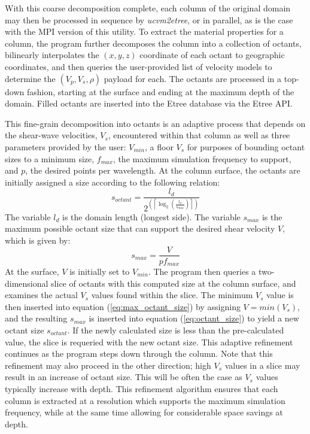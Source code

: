 With this coarse decomposition complete, each column of the original domain may then be processed in sequence by \emph{ucvm2etree}, or in parallel, as is the case with the MPI version of this utility. To extract the material properties for a column, the program further decomposes the column into a collection of octants, bilinearly interpolates the $(x,y,z)$ coordinate of each octant to geographic coordinates, and then queries the user-provided list of velocity models to determine the $(V_p, V_s, \rho)$ payload for each. The octants are processed in a top-down fashion, starting at the surface and ending at the maximum depth of the domain. Filled octants are inserted into the Etree database via the Etree API.

This fine-grain decomposition into octants is an adaptive process that depends on the shear-wave velocities, $V_s$, encountered within that column as well as three parameters provided by the user: $V_{min}$, a floor $V_s$ for purposes of bounding octant sizes to a minimum size, $f_{max}$, the maximum simulation frequency to support, and $p$, the desired points per wavelength. At the column surface, the octants are initially assigned a size according to the following relation:
\begin{equation}\label{eq:octant_size}
s_{octant} = \frac{l_{d}}{ 2^{\left( \left\lceil \log_{2}(\frac{l_{d}}{s_{max}}) \right\rceil \right)} }
\end{equation}
The variable $l_{d}$ is the domain length (longest side). The variable $s_{max}$ is the maximum possible octant size that can support the desired shear velocity $V$, which is given by:
\begin{equation}\label{eq:max_octant_size}
s_{max} = \frac{V}{p f_{max}}
\end{equation}
At the surface, $V$ is initially set to $V_{min}$. The program then queries a two-dimensional slice of octants with this computed size at the column surface, and examines the actual $V_s$ values found within the slice. The minimum $V_s$ value is then inserted into equation (\ref{eq:max_octant_size}) by assigning $V = min(V_s)$, and the resulting $s_{max}$ is inserted into equation (\ref{eq:octant_size}) to yield a new octant size $s_{octant}$. If the newly calculated size is less than the pre-calculated value, the slice is requeried with the new octant size. This adaptive refinement continues as the program steps down through the column. Note that this refinement may also proceed in the other direction; high $V_s$ values in a slice may result in an increase of octant size. This will be often the case as $V_s$ values typically increase with depth. This refinement algorithm ensures that each column is extracted at a resolution which supports the maximum simulation frequency, while at the same time allowing for considerable space savings at depth.


